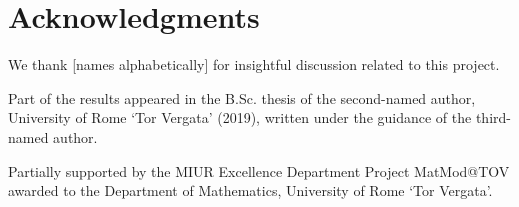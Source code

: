 
\section*{Acknowledgments}

We thank [names alphabetically] for insightful discussion related to this project.

Part of the results appeared in the B.Sc. thesis of the second-named author, University of Rome `Tor Vergata' (2019), written under the guidance of the third-named author.

Partially supported by the MIUR Excellence Department Project
MatMod@TOV awarded to the Department of Mathematics, University of Rome
`Tor Vergata'.